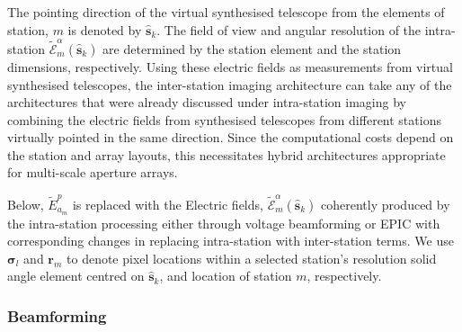 \documentclass[
  journal=pasa,
  manuscript=article-type,
  year=2020,
  volume=37,
]{cup-journal}
\begin{document}
The pointing direction of the virtual synthesised telescope from the elements of station, $m$ is denoted by $\hat{\boldsymbol{s}}_k$. The field of view and angular resolution of the intra-station $\widetilde{\mathcal{E}}_m^\alpha(\hat{\boldsymbol{s}}_k)$ are determined by the station element and the station dimensions, respectively. Using these electric fields as measurements from virtual synthesised telescopes, the inter-station imaging architecture can take any of the architectures that were already discussed under intra-station imaging by combining the electric fields from synthesised telescopes from different stations virtually pointed in the same direction. Since the computational costs depend on the station and array layouts, this necessitates hybrid architectures appropriate for multi-scale aperture arrays. 

Below, $\widetilde{E}_{a_m}^p$ is replaced with the Electric fields, $\widetilde{\mathcal{E}}_m^\alpha(\hat{\boldsymbol{s}}_k)$
coherently produced by the intra-station processing either through voltage beamforming or EPIC with corresponding changes in replacing intra-station with inter-station terms. We use $\boldsymbol{\sigma}_l$ and $\boldsymbol{r}_{m}$ to denote pixel locations within a selected station's resolution solid angle element centred on $\hat{\boldsymbol{s}}_k$, and location of station $m$, respectively. 

\subsubsection{Beamforming}
\end{document}
